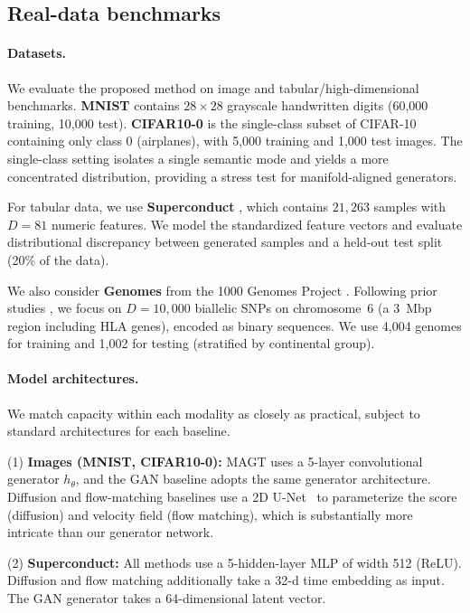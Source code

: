 \documentclass[12pt]{article}
\theoremstyle{definition} %
\providecommand{\method}{MAGT} %
\begin{document}
\subsection{Real-data benchmarks}
\label{sec:experiments-real}

\paragraph{Datasets.}
We evaluate the proposed method on image and tabular/high-dimensional benchmarks.
\textbf{MNIST} \citep{lecun1998gradient} contains $28\times 28$ grayscale handwritten digits (60{,}000 training, 10{,}000 test).
\textbf{CIFAR10-0} is the single-class subset of CIFAR-10 \citep{krizhevsky2009learning} containing only class 0 (airplanes), with 5{,}000 training and 1{,}000 test images.
The single-class setting isolates a single semantic mode and yields a more concentrated distribution, providing a stress test for manifold-aligned generators.

For tabular data, we use \textbf{Superconduct} \citep{hamidieh2018superconduct}, which contains $21{,}263$ samples with $D=81$ numeric features.
We model the standardized feature vectors and evaluate distributional discrepancy between generated samples and a held-out test split (20\% of the data).

We also consider \textbf{Genomes} from the 1000 Genomes Project \citep{1000genomes2015}.
Following prior studies \citep{yelmen2023deep,ahronoviz2024genome}, we focus on $D=10{,}000$ biallelic SNPs on chromosome~6 (a 3~Mbp region including HLA genes), encoded as binary sequences.
We use 4,004 genomes for training and 1,002 for testing (stratified by continental group).

\paragraph{Model architectures.}
We match capacity within each modality as closely as practical, subject to standard architectures for each baseline.

(1) \textbf{Images (MNIST, CIFAR10-0):} \method{} uses a 5-layer convolutional generator $h_{\theta}$, and the GAN baseline adopts the same generator architecture. Diffusion and flow-matching baselines use a 2D U-Net~\citep{von-platen-etal-2022-diffusers} to parameterize the score (diffusion) and velocity field (flow matching), which is substantially more intricate than our generator network.

(2) \textbf{Superconduct:} All methods use a 5-hidden-layer MLP of width 512 (ReLU). Diffusion and flow matching additionally take a 32-d time embedding as input.
The GAN generator takes a 64-dimensional latent vector.
\end{document}
